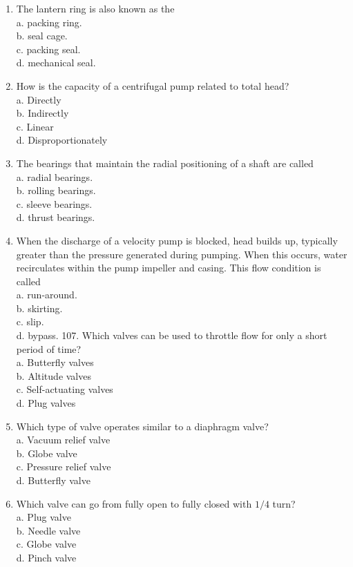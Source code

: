 \documentclass[10pt]{article}
\begin{document}
\begin{enumerate}
  \item The lantern ring is also known as the\\
a. packing ring.\\
b. seal cage.\\
c. packing seal.\\
d. mechanical seal.

  \item How is the capacity of a centrifugal pump related to total head?\\
a. Directly\\
b. Indirectly\\
c. Linear\\
d. Disproportionately

  \item The bearings that maintain the radial positioning of a shaft are called\\
a. radial bearings.\\
b. rolling bearings.\\
c. sleeve bearings.\\
d. thrust bearings.

  \item When the discharge of a velocity pump is blocked, head builds up, typically greater than the pressure generated during pumping. When this occurs, water recirculates within the pump impeller and casing. This flow condition is called\\
a. run-around.\\
b. skirting.\\
c. slip.\\
d. bypass. 107. Which valves can be used to throttle flow for only a short period of time?\\
a. Butterfly valves\\
b. Altitude valves\\
c. Self-actuating valves\\
d. Plug valves

  \item Which type of valve operates similar to a diaphragm valve?\\
a. Vacuum relief valve\\
b. Globe valve\\
c. Pressure relief valve\\
d. Butterfly valve

  \item Which valve can go from fully open to fully closed with $1 / 4$ turn?\\
a. Plug valve\\
b. Needle valve\\
c. Globe valve\\
d. Pinch valve


\end{enumerate}
\end{document}
